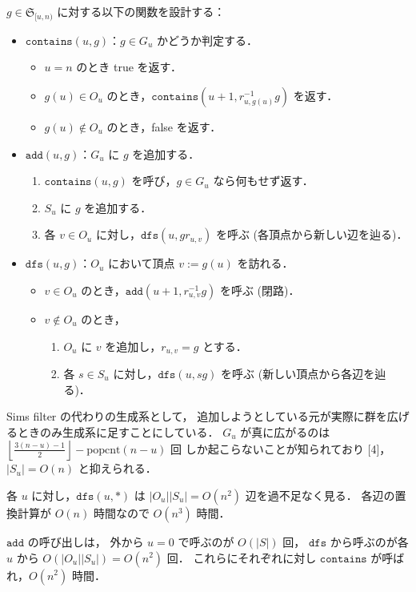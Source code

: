 \documentclass{jsarticle}
\newcommand{\abs}[1]{\lvert #1 \rvert}
\renewcommand{\S}{\mathfrak{S}}
\begin{document}
$g \in \S_{[u,n)}$ に対する以下の関数を設計する：
\begin{itemize}
  \item $\mathtt{contains}(u, g)$：$g \in G_u$ かどうか判定する．
    \begin{itemize}
      \item $u = n$ のとき true を返す．
      \item $g(u) \in O_u$ のとき，$\mathtt{contains}(u+1, r_{u,g(u)}^{-1} g)$ を返す．
      \item $g(u) \not\in O_u$ のとき，false を返す．
    \end{itemize}
  \item $\mathtt{add}(u, g)$：$G_u$ に $g$ を追加する．
    \begin{enumerate}
      \item $\mathtt{contains}(u, g)$ を呼び，$g \in G_u$ なら何もせず返す．
      \item $S_u$ に $g$ を追加する．
      \item 各 $v \in O_u$ に対し，$\mathtt{dfs}(u, g r_{u,v})$ を呼ぶ (各頂点から新しい辺を辿る)．
    \end{enumerate}
  \item $\mathtt{dfs}(u, g)$：$O_u$ において頂点 $v := g(u)$ を訪れる．
    \begin{itemize}
      \item $v \in O_u$ のとき，$\mathtt{add}(u+1, r_{u,v}^{-1} g)$ を呼ぶ (閉路)．
      \item $v \not\in O_u$ のとき，
        \begin{enumerate}
          \item $O_u$ に $v$ を追加し，$r_{u,v} = g$ とする．
          \item 各 $s \in S_u$ に対し，$\mathtt{dfs}(u, s g)$ を呼ぶ (新しい頂点から各辺を辿る)．
        \end{enumerate}
    \end{itemize}
\end{itemize}

Sims filter の代わりの生成系として，
追加しようとしている元が実際に群を広げるときのみ生成系に足すことにしている．
$G_u$ が真に広がるのは
$\left\lfloor\frac{3(n-u)-1}{2}\right\rfloor - \mathrm{popcnt}(n-u)$ 回
しか起こらないことが知られており [4]，
$\abs{S_u} = O(n)$ と抑えられる．

各 $u$ に対し，$\mathtt{dfs}(u, *)$ は
$\abs{O_u} \abs{S_u} = O(n^2)$ 辺を過不足なく見る．
各辺の置換計算が $O(n)$ 時間なので $O(n^3)$ 時間．

$\mathtt{add}$ の呼び出しは，
外から $u = 0$ で呼ぶのが $O(\abs{S})$ 回，
$\mathtt{dfs}$ から呼ぶのが各 $u$ から $O(\abs{O_u} \abs{S_u}) = O(n^2)$ 回．
これらにそれぞれに対し $\mathtt{contains}$ が呼ばれ，$O(n^2)$ 時間．
\end{document}
